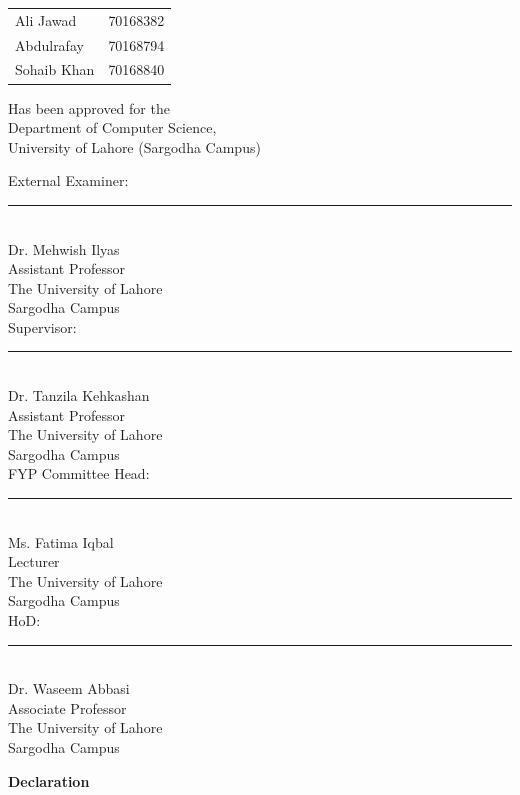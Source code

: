 \documentclass[12pt,a4paper]{report}
\begin{document}
\begin{center}
\begin{tabular}{lr}
Ali Jawad & 70168382 \\
Abdulrafay & 70168794 \\
Sohaib Khan & 70168840 \\
\end{tabular}
\end{center}

\begin{center}
Has been approved for the \\
Department of Computer Science,\\
University of Lahore (Sargodha Campus)\\[0.6cm]
\end{center}

\noindent External Examiner: \rule{12cm}{0.5pt}\\
Dr. Mehwish Ilyas\\
Assistant Professor \\
The University of Lahore \\
Sargodha Campus\\[0.6cm]

\noindent Supervisor: \rule{13.5cm}{0.5pt}\\
Dr. Tanzila Kehkashan \\
Assistant Professor\\
The University of Lahore \\
Sargodha Campus\\[0.6cm]

\noindent FYP Committee Head: \rule{12cm}{0.5pt}\\
Ms. Fatima Iqbal\\
Lecturer \\
The University of Lahore \\
Sargodha Campus\\[0.6cm]

\noindent HoD: \rule{14.6cm}{0.5pt}\\
Dr. Waseem Abbasi\\
Associate Professor\\
The University of Lahore \\
Sargodha Campus
\newpage
\begin{center}
\Large{\textbf{Declaration}}\\[1cm]
\end{center}
\end{document}
